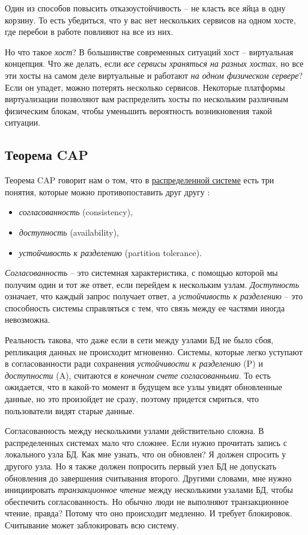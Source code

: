 \documentclass[%
	11pt,
	a4paper,
	utf8,
		]{article}
\begin{document}
Один из способов повысить отказоустойчивость -- не класть все яйца в одну корзину. То есть убедиться, что у вас нет нескольких сервисов на одном хосте, где перебои в работе повлияют на все из них.

Но что такое \emph{хост}? В большинстве современных ситуаций хост -- виртуальная концепция. Что же делать, если \emph{все сервисы храняться на разных хостах}, но все эти хосты на самом деле виртуальные и работают \emph{на одном физическом сервере}? Если он упадет, можно потерять несколько сервисов. Некоторые платформы виртуализации позволяют вам распределить хосты по нескольким различным физическим блокам, чтобы уменьшить вероятность возникновения такой ситуации.

\subsection{Теорема CAP}

Теорема CAP говорит нам о том, что в \underline{распределенной системе} есть три понятия, которые можно противопоставить друг другу \cite[]{microservices-2024}: 
\begin{itemize}
	\item \emph{согласованность} (consistency),
	
	\item \emph{доступность} (availability),
	
	\item \emph{устойчивость к разделению} (partition tolerance).
\end{itemize}

\emph{Согласованность} -- это системная характеристика, с помощью которой мы получим один и тот же ответ, если перейдем к нескольким узлам. \emph{Доступность} означает, что каждый запрос получает ответ, а \emph{устойчивость к разделению} -- это способность системы справляться с тем, что связь между ее частями иногда невозможна.

Реальность такова, что даже если в сети между узлами БД не было сбоя, репликация данных не происходит мгновенно. {\color{blue}Системы, которые легко уступают в согласованности ради сохранения \emph{устойчивости к разделению} (P) и \emph{доступности} (A), считаются \emph{в конечном счете согласованными}}. То есть ожидается, что в какой-то момент в будущем все узлы увидят обновленные данные, но это произойдет не сразу, поэтому придется смриться, что пользователи видят старые данные.

Согласованность между несколькими узлами действительно сложна. В распределенных системах мало что сложнее. Если нужно прочитать запись с локального узла БД. Как мне узнать, что он обновлен? Я должен спросить у другого узла. Но я также должен попросить первый узел БД не допускать обновления до завершения считывания второго. Другими словами, мне нужно инициировать \emph{транзакционное чтение} между несколькими узалами БД, чтобы обеспечить согласованность. Но обычно люди не выполняют транзакционное чтение, правда? Потому что оно происходит медленно. И требует блокировок. Считывание может заблокировать всю систему.
\end{document}
